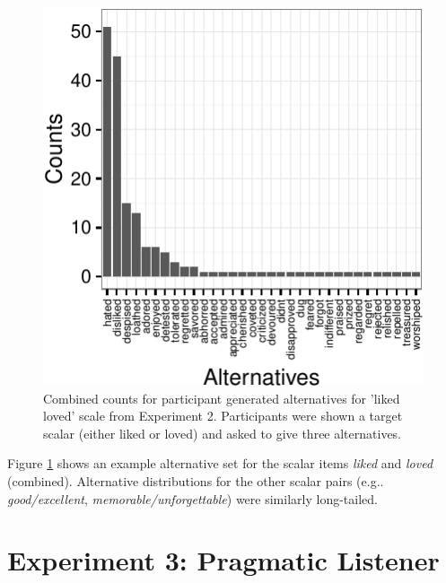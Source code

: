 \documentclass[10pt, letterpaper]{article}
\newenvironment{CodeChunk}{}{}
\begin{document}
\begin{CodeChunk}
\begin{figure}[t]

{\centering \includegraphics{figs/exp2_altsPlot_likedLoved-1} 

}

\caption[Combined counts for participant generated alternatives for 'liked  loved' scale from Experiment 2]{Combined counts for participant generated alternatives for 'liked  loved' scale from Experiment 2. Participants were shown a target scalar (either liked or loved) and asked to give three alternatives.}\label{fig:exp2_altsPlot_likedLoved}
\end{figure}
\end{CodeChunk}

Figure \ref{fig:exp2_altsPlot_likedLoved} shows an example alternative
set for the scalar items \emph{liked} and \emph{loved} (combined).
Alternative distributions for the other scalar pairs (e.g..
\emph{good/excellent}, \emph{memorable/unforgettable}) were similarly
long-tailed.

\section{Experiment 3: Pragmatic
Listener}\label{experiment-3-pragmatic-listener}
\end{document}
